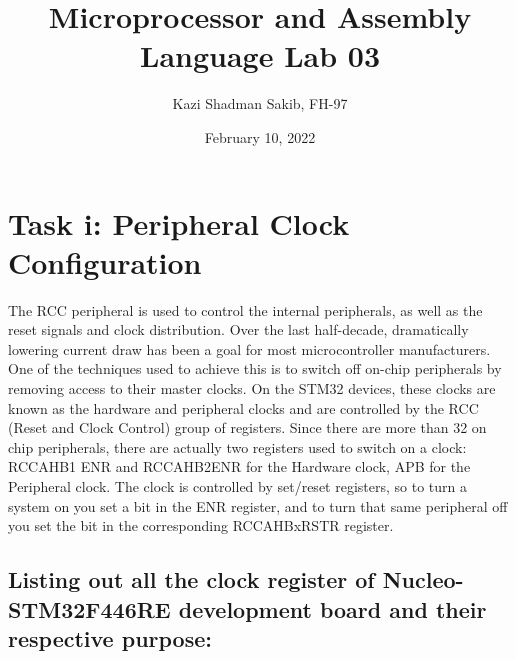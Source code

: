 \documentclass{article}
\title{Microprocessor and Assembly Language Lab 03}
\author{Kazi Shadman Sakib, FH-97}
\date{February 10, 2022}
\begin{document}
\maketitle

\section{Task i: Peripheral Clock Configuration}
The RCC peripheral is used to control the internal peripherals, as well as the reset signals and clock distribution. Over the last half-decade, dramatically lowering current draw has been a goal for most microcontroller manufacturers. One of the techniques used to achieve this is to switch off on-chip peripherals by removing access to their master clocks. On the STM32 devices, these clocks are known as the hardware and peripheral clocks and are controlled by the RCC (Reset and Clock Control) group of registers. Since there are more than 32 on chip peripherals, there are actually two registers used to switch on a clock: RCC\textunderscore AHB1 ENR and RCC\textunderscore AHB2ENR for the Hardware clock, APB for the Peripheral clock. The clock is controlled by set/reset registers, so to turn a system on you set a bit in the ENR register, and to turn that same peripheral off you set the bit in the corresponding RCC\textunderscore AHBxRSTR register.

\subsection{Listing out all the clock register of Nucleo-STM32F446RE development board and their respective purpose:}
\end{document}
